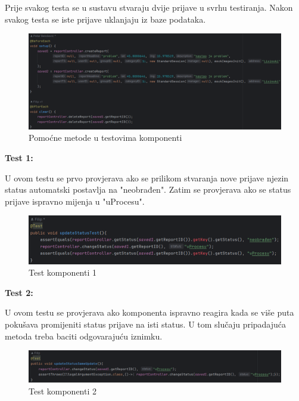 			Prije svakog testa se u sustavu stvaraju dvije prijave u svrhu testiranja. Nakon svakog testa se iste prijave uklanjaju iz baze podataka.
			
			\begin{figure}[H]
				\includegraphics[width=\textwidth]{slike/JUnitTestoviPomocneMetode.png} %
				\caption{Pomoćne metode u testovima komponenti}
				\label{fig:JUnitTestoviPomocne} %
			\end{figure}
			
			\textbf{Test 1:}
			
			U ovom testu se prvo provjerava ako se prilikom stvaranja nove prijave njezin status automatski postavlja na "neobrađen". Zatim se provjerava ako se status prijave ispravno mijenja u "uProcesu".
			
			\begin{figure}[H]
				\includegraphics[width=\textwidth]{slike/JUnitTest1.png} %
				\caption{Test komponenti 1}
				\label{fig:JUnitTest1} %
			\end{figure}
			
			\textbf{Test 2:}
			
			U ovom testu se provjerava ako komponenta ispravno reagira kada se više puta pokušava promijeniti status prijave na isti status. U tom slučaju pripadajuća metoda treba baciti odgovarajuću iznimku.
			
			\begin{figure}[H]
				\includegraphics[width=\textwidth]{slike/JUnitTest2.png} %
				\caption{Test komponenti 2}
				\label{fig:JUnitTest2} %
			\end{figure}
			
